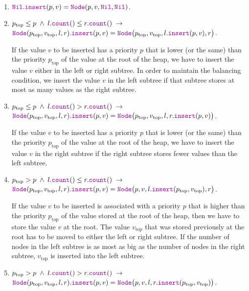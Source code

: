 \begin{enumerate}
\item $\mytt{Nil}.\mytt{insert}(p,v) = \mytt{Node}(p,v,\mytt{Nil}, \mytt{Nil})$.
\item $p_{\mathrm{top}} \leq p \;\wedge\; l.\mytt{count}() \leq r.\mytt{count}() \;\rightarrow $   \\[0.1cm]
      \hspace*{1.3cm} 
      $\mytt{Node}(p_{\mathrm{top}},v_\mathrm{top},l,r).\mytt{insert}(p,v) =
                 \mytt{Node}\bigl(p_\mathrm{top},v_\mathrm{top},l.\mytt{insert}(p,v), r\bigr)$.
                 
      If the value $v$ to be inserted has a priority $p$ that is lower (or the same) than the priority
      $p_{\mathrm{top}}$ of
      the value at the root of the heap, we have to insert the value $v$ either in the left or right
      subtree.  In order to maintain the balancing condition, we insert the value $v$ in the left
      subtree if that subtree stores at most as many values as the right subtree.
\item $p_{\mathrm{top}} \leq p \;\wedge\; l.\mytt{count}() > r.\mytt{count}() \;\rightarrow $   \\[0.1cm]
      \hspace*{1.3cm} 
      $\mytt{Node}(p_{\mathrm{top}},v_\mathrm{top},l,r).\mytt{insert}(p,v) =
                 \mytt{Node}\bigl(p_\mathrm{top},v_\mathrm{top},l,r.\mytt{insert}(p,v)\bigr)$.

      If the value $v$ to be inserted has a priority $p$ that is lower (or the same) than the priority
      $p_{\mathrm{top}}$ of
      the value at the root of the heap, we have to insert the value $v$ in the right
      subtree if the right subtree  stores fewer values than the left subtree.
\item $p_{\mathrm{top}} > p \;\wedge\; l.\mytt{count}() \leq r.\mytt{count}() \;\rightarrow $ \\[0.1cm]
      \hspace*{1.3cm} 
      $\mytt{Node}(p_{\mathrm{top}},v_\mathrm{top},l,r).\mytt{insert}(p,v) =
                 \mytt{Node}\bigl(p,v,l.\mytt{insert}(p_\mathrm{top},v_\mathrm{top}), r\bigr)$.

      If the value $v$ to be inserted is associated with a priority $p$ that is higher than the priority
      $p_{\mathrm{top}}$ of
      the value stored at the root of the heap, then we have to store the value $v$ at the root.
      The value $v_\mathrm{top}$ that was stored previously at the root has to be moved to either
      the left or right subtree.  If the number of nodes in the left subtree is as most as big as
      the number of nodes in the right subtree, $v_\mathrm{top}$ is inserted into the left subtree.
\item $p_{\mathrm{top}} > p \;\wedge\; l.\mytt{count}() > r.\mytt{count}() \;\rightarrow $ \\[0.1cm] 
      \hspace*{1.3cm} 
      $\mytt{Node}(p_{\mathrm{top}},v_\mathrm{top},l,r).\mytt{insert}(p,v) =
                 \mytt{Node}\bigl(p,v,l,r.\mytt{insert}(p_\mathrm{top},v_\mathrm{top})\bigr)$.


\end{enumerate}

